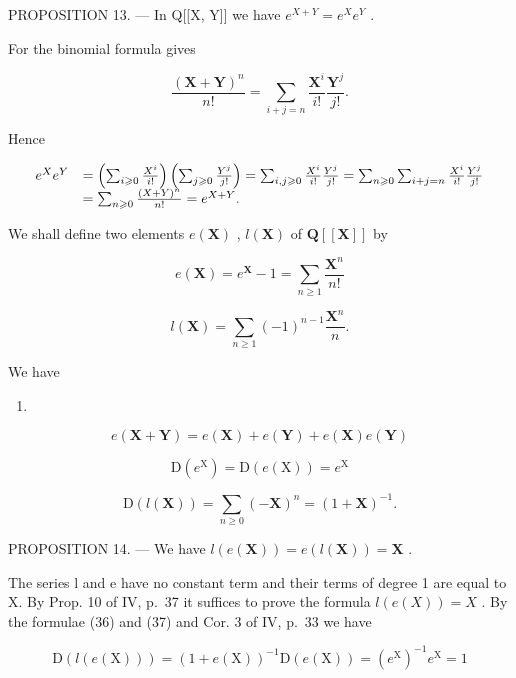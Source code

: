 PROPOSITION 13. --- In Q{[}{[}X, Y{]}{]} we have \(e^{X + Y} = e^X e^Y\) .

For the binomial formula gives

\[
\frac {(\mathbf {X} + \mathbf {Y}) ^ {n}}{n !} = \sum_ {i + j = n} \frac {\mathbf {X} ^ {i}}{i !} \frac {\mathbf {Y} ^ {j}}{j !}.
\]

Hence

\[
\begin{array}{r l} e ^ {X} e ^ {Y} & = \left(\sum_ {i \geqslant 0} \frac {X ^ {i}}{i !}\right) \left(\sum_ {j \geqslant 0} \frac {Y ^ {j}}{j !}\right) = \sum_ {i, j \geqslant 0} \frac {X ^ {i}}{i !} \frac {Y ^ {j}}{j !} = \sum_ {n \geqslant 0} \sum_ {i + j = n} \frac {X ^ {i}}{i !} \frac {Y ^ {j}}{j !} \\ & = \sum_ {n \geqslant 0} \frac {(X + Y) ^ {n}}{n !} = e ^ {X + Y}. \end{array}
\]

We shall define two elements \(e(\mathbf{X})\) , \(l(\mathbf{X})\) of \(\mathbf{Q}[[\mathbf{X}]]\) by

\[
e (\mathbf {X}) = e ^ {\mathbf {X}} - 1 = \sum_ {n \geqslant 1} \frac {\mathbf {X} ^ {n}}{n !}\tag{33}
\]

\[
l (\mathbf {X}) = \sum_ {n \geqslant 1} (- 1) ^ {n - 1} \frac {\mathbf {X} ^ {n}}{n}.\tag{34}
\]

We have

\begin{enumerate}
\def\labelenumi{(\arabic{enumi})}
\setcounter{enumi}{34}
\tightlist
\item
\end{enumerate}

\[
e (\mathbf {X} + \mathbf {Y}) = e (\mathbf {X}) + e (\mathbf {Y}) + e (\mathbf {X}) e (\mathbf {Y})
\]

\[
\mathrm{D} (e ^ {\mathrm{X}}) = \mathrm{D} (e (\mathrm{X})) = e ^ {\mathrm{X}}\tag{36}
\]

\[
\mathrm{D} (l (\mathbf {X})) = \sum_ {n \geqslant 0} (- \mathbf {X}) ^ {n} = (1 + \mathbf {X}) ^ {- 1}.\tag{37}
\]

PROPOSITION 14. --- We have \(l(e(\mathbf{X})) = e(l(\mathbf{X})) = \mathbf{X}\) .

The series l and e have no constant term and their terms of degree 1 are equal to X. By Prop. 10 of IV, p.~37 it suffices to prove the formula \(l(e(X)) = X\) . By the formulae (36) and (37) and Cor. 3 of IV, p.~33 we have

\[
\mathrm{D} (l (e (\mathrm{X}))) = (1 + e (\mathrm{X})) ^ {- 1} \mathrm{D} (e (\mathrm{X})) = (e ^ {\mathrm{X}}) ^ {- 1} e ^ {\mathrm{X}} = 1
\]

